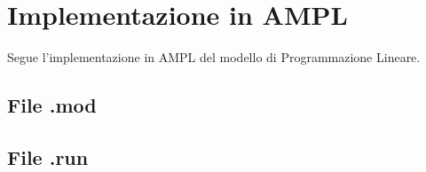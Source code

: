 


\section{Implementazione in AMPL}

Segue l'implementazione in AMPL del modello di Programmazione Lineare.

	\subsection{File .mod}
		
		\newpage

	\subsection{File .run}
		
		\newpage